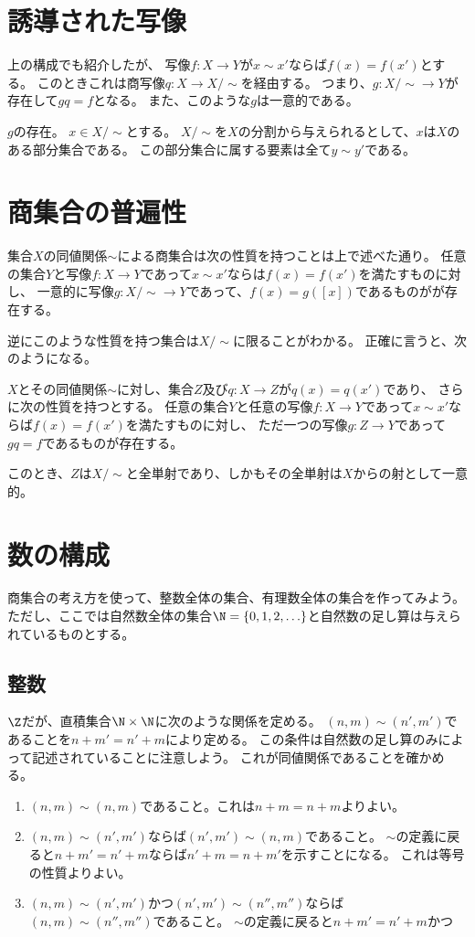 \section{誘導された写像}
上の構成でも紹介したが、
写像$f:X\to Y$が$x\sim x'$ならば$f(x)=f(x')$とする。
このときこれは商写像$q:X \to X/\sim$を経由する。
つまり、$g:X/\sim \to Y$が存在して$gq=f$となる。
また、このような$g$は一意的である。

$g$の存在。
$x\in X/\sim$とする。
$X/\sim$を$X$の分割から与えられるとして、$x$は$X$のある部分集合である。
この部分集合に属する要素は全て$y\sim y'$である。


\section{商集合の普遍性}
集合$X$の同値関係$\sim$による商集合は次の性質を持つことは上で述べた通り。
任意の集合$Y$と写像$f:X \to Y$であって$x\sim x'$ならは$f(x)=f(x')$を満たすものに対し、
一意的に写像$g:X/\sim\to Y$であって、$f(x)=g([x])$であるものがが存在する。

逆にこのような性質を持つ集合は$X/\sim$に限ることがわかる。
正確に言うと、次のようになる。
\begin{thm}[商集合の普遍性]
  $X$とその同値関係$\sim$に対し、集合$Z$及び$q:X \to Z$が$q(x)=q(x')$であり、
  さらに次の性質を持つとする。
  任意の集合$Y$と任意の写像$f:X \to Y$であって$x\sim x'$ならば$f(x)=f(x')$を満たすものに対し、
  ただ一つの写像$g:Z \to Y$であって$gq=f$であるものが存在する。

  このとき、$Z$は$X/\sim$と全単射であり、しかもその全単射は$X$からの射として一意的。
\end{thm}

\section{数の構成}
商集合の考え方を使って、整数全体の集合、有理数全体の集合を作ってみよう。
ただし、ここでは自然数全体の集合$\N=\{0,1,2,\ldots\}$と自然数の足し算は与えられているものとする。

\subsection{整数}
$\Z$だが、直積集合$\N\times\N$に次のような関係を定める。
$(n,m)\sim(n',m')$であることを$n+m'=n'+m$により定める。
この条件は自然数の足し算のみによって記述されていることに注意しよう。
これが同値関係であることを確かめる。
\begin{enumerate}
\item $(n,m)\sim(n,m)$であること。これは$n+m=n+m$よりよい。
\item $(n,m)\sim(n',m')$ならば$(n',m')\sim(n,m)$であること。
$\sim$の定義に戻ると$n+m'=n'+m$ならば$n'+m=n+m'$を示すことになる。
これは等号の性質よりよい。
\item $(n,m)\sim(n',m')$かつ$(n',m')\sim(n'',m'')$ならば$(n,m)\sim(n'',m'')$であること。
$\sim$の定義に戻ると$n+m'=n'+m$かつ
\end{enumerate}

